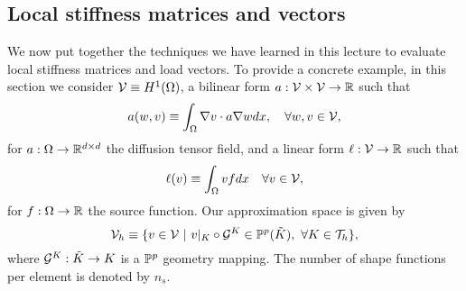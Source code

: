 \subsection{Local stiffness matrices and vectors}
We now put together the techniques we have learned in this lecture to evaluate local stiffness matrices and load vectors.  To provide a concrete example, in this section we consider $\mathcal{V} \equiv H^1(\Omega)$, a bilinear form $a: \mathcal{V} \times \mathcal{V} \to \mathbb{R}$ such that
\begin{equation}
  a(w,v) \equiv \int_\Omega \nabla v \cdot a \nabla w dx , \quad \forall w,v \in \mathcal{V},
  \label{eq:fe_impl_model_a}
\end{equation}
for $a: \Omega \to \mathbb{R}^{d \times d}$ the diffusion tensor field, and a linear form $\ell: \mathcal{V} \to \mathbb{R}$ such that
\begin{equation}
  \ell(v) \equiv \int_\Omega v f dx \quad \forall v \in \mathcal{V},
  \label{eq:fe_impl_model_ell}
\end{equation}
for $f: \Omega \to \mathbb{R}$ the source function. Our approximation space is given by
\begin{equation}
  \calV_h \equiv \{ v \in \calV \ | \ v|_K \circ \calG^K \in \PP^p(\tilde K), \ \forall K \in \calT_h \},
  \label{eq:fe_impl_loc_vh}
\end{equation}
where $\mathcal{G}^K: \tilde K \to K$ is a $\mathbb{P}^p$ geometry mapping. The number of shape functions per element is denoted by $n_s$.

